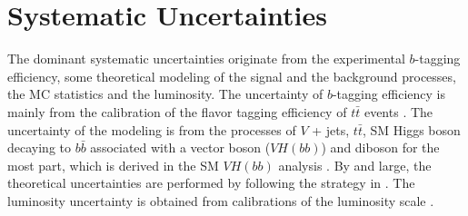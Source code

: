 \documentclass[class=NTHU_thesis, crop=false]{standalone}
\begin{document}
\chapter{Systematic Uncertainties}
\label{chap:systematic_uncertainties}
The dominant systematic uncertainties originate from the experimental $b$-tagging efficiency, some theoretical modeling of the signal and the background processes, the MC statistics and the luminosity. The uncertainty of $b$-tagging efficiency is mainly from the calibration of the flavor tagging efficiency of $t\bar{t}$ events \cite{ATL-PHYS-PUB-2017-013} \cite{1512.01094}. The uncertainty of the modeling is from the processes of $V$ + jets, $t\bar{t}$, SM Higgs boson decaying to $b\bar{b}$ associated with a vector boson ($VH(bb)$) and diboson for the most part, which is derived in the SM $VH(bb)$ analysis \cite{Pandini:2111370} \cite{Robson:2235887}. By and large, the theoretical uncertainties are performed by following the strategy in \cite{ATLAS-CONF-2018-036}. The luminosity uncertainty is obtained from calibrations of the luminosity scale \cite{Aaboud2016}.
\end{document}
